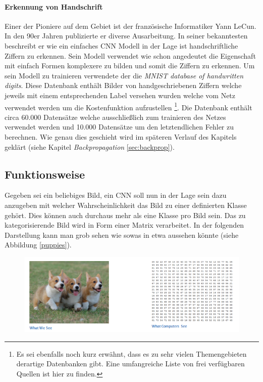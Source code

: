 \paragraph{Erkennung von Handschrift}
Einer der Pioniere auf dem Gebiet ist der französische Informatiker Yann LeCun. In den 90er Jahren publizierte er diverse Ausarbeitung. In seiner bekanntesten beschreibt er wie ein einfaches CNN Modell in der Lage ist handschriftliche Ziffern zu erkennen. Sein Modell verwendet wie schon angedeutet die Eigenschaft mit einfach Formen komplexere zu bilden und somit die Ziffern zu erkennen. Um sein Modell zu trainieren verwendete der die \emph{MNIST database of handwritten digits}. Diese Datenbank enthält Bilder von handgeschriebenen Ziffern welche jeweils mit einem entsprechenden Label versehen wurden welche vom Netz verwendet werden um die Kostenfunktion aufzustellen \footnote{Es sei ebenfalls noch kurz erwähnt, dass es zu sehr vielen Themengebieten derartige Datenbanken gibt. Eine umfangreiche Liste von frei verfügbaren Quellen ist hier \cite{openDataSets} zu finden.}. Die Datenbank enthält circa 60.000 Datensätze welche ausschließlich zum trainieren des Netzes verwendet werden und 10.000 Datensätze um den letztendlichen Fehler zu berechnen. Wie genau dies geschieht wird im späteren Verlauf des Kapitels geklärt (siehe Kapitel \emph{Backpropagation} \ref{sec:backprop}).

\subsection{Funktionsweise}
Gegeben sei ein beliebiges Bild, ein CNN soll nun in der Lage sein dazu anzugeben mit welcher Wahrscheinlichkeit das Bild zu einer definierten Klasse gehört. Dies können auch durchaus mehr als eine Klasse pro Bild sein. Das zu kategorisierende Bild wird in Form einer Matrix verarbeitet. In der folgenden Darstellung kann man grob sehen wie sowas in etwa aussehen könnte (siehe Abbildung \ref{puppies}). 

\begin{figure}[!htb]
	\centering
	\includegraphics[width=.9\linewidth]{img/humanVsPc}
	\label{fig:puppies}
\end{figure}

